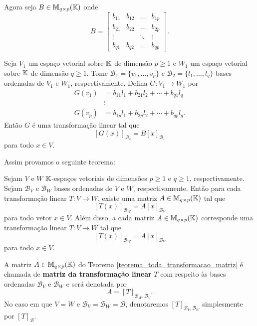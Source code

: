 Agora seja $B \in \mathbb{M}_{q\times p}(\mathbb{K})$ onde
\[
  B = \begin{bmatrix}
    b_{11} & b_{12} & \dots & b_{1p}\\
    b_{21} & b_{22} & \dots & b_{2p}\\
    \vdots & & \ddots & \vdots\\
    b_{q1} & b_{q2} & \dots & b_{qp}
  \end{bmatrix}.
\]

Seja $V_1$ um espaço vetorial sobre $\mathbb{K}$ de dimensão $p \ge 1$ e $W_1$ um espaço vetorial sobre $\mathbb{K}$ de dimensão $q \ge 1$. Tome $\mathcal{B}_1 = \{v_1,\dots,v_p\}$ e $\mathcal{B}_2 = \{l_1,\dots,l_q\}$ bases ordenadas de $V_1$ e $W_1$, respectivamente. Defina $G \colon V_1 \to W_1$ por
\begin{align*}
  G(v_1) &= b_{11}l_1 + b_{21}l_2 + \cdots + b_{q1}l_q\\
  &\vdots\\
  G(v_p) &= b_{1p}l_1 + b_{2p}l_2 + \cdots + b_{qp}l_q.
\end{align*}
Então $G$ é uma transformação linear  tal que
\[
  [G(x)]_{\mathcal{B}_2} = B[x]_{\mathcal{B}_1}
\]
para todo $x \in V$.

Assim provamos o seguinte teorema:
\begin{teorema}\label{teorema_toda_transformacao_matriz}
  Sejam $V$ e $W$ $\mathbb{K}$-espaços vetoriais de dimensões $p \ge 1$ e $q \ge 1$, respectivamente. Sejam $\mathcal{B}_V$ e $\mathcal{B}_W$ bases ordenadas de $V$ e $W$, respectivamente. Então para cada transformação linear $T \colon V \to W$, existe uma matriz $A \in \mathbb{M}_{q\times p}(\mathbb{K})$ tal que
  \[
    [T(x)]_{\mathcal{B}_W} = A[x]_{\mathcal{B}_V}
  \]
  para todo vetor $x \in V$. Além disso, a cada matriz $A \in \mathbb{M}_{q\times p}(\mathbb{K})$ corresponde uma transformação linear $T \colon V \to W$ tal que
  \[
    [T(x)]_{\mathcal{B}_W} = A[x]_{\mathcal{B}_V}
  \]
  para todo $x \in V$.
\end{teorema}

\begin{definicao}
  A matriz $A \in \mathbb{M}_{q\times p}(\mathbb{K})$ do Teorema \ref{teorema_toda_transformacao_matriz} é chamada de \textbf{matriz da transformação linear} $T$ com respeito \`as bases ordenadas $\mathcal{B}_V$ e $\mathcal{B}_W$ e será denotada por
  \[
    A = [T]_{\mathcal{B}_{W},\mathcal{B}_{V}}.
  \]
  No caso em que $V = W$ e $\mathcal{B}_V = \mathcal{B}_W = \mathcal{B}$, denotaremos $[T]_{\mathcal{B}_{V},\mathcal{B}_{W}}$ simplesmente por $[T]_\mathcal{B}$.
\end{definicao}

